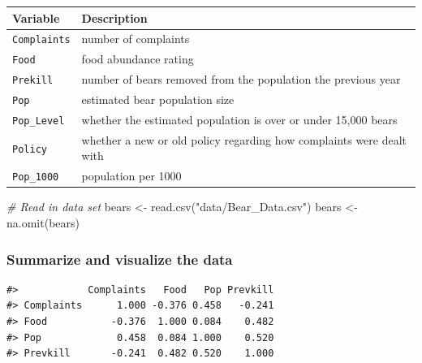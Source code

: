 \documentclass[
]{report}
\newenvironment{Shaded}{\begin{snugshade}}{\end{snugshade}}
\newcommand{\CommentTok}[1]{\textcolor[rgb]{0.56,0.35,0.01}{\textit{#1}}}
\newcommand{\FunctionTok}[1]{\textcolor[rgb]{0.00,0.00,0.00}{#1}}
\newcommand{\NormalTok}[1]{#1}
\newcommand{\OtherTok}[1]{\textcolor[rgb]{0.56,0.35,0.01}{#1}}
\newcommand{\StringTok}[1]{\textcolor[rgb]{0.31,0.60,0.02}{#1}}
\begin{document}
\begin{longtable}[]{@{}
  >{\raggedright\arraybackslash}p{}
  >{\raggedright\arraybackslash}p{}@{}}
\toprule
\textbf{Variable} & \textbf{Description} \\
\midrule
\endhead
\texttt{Complaints} & number of complaints \\
\texttt{Food} & food abundance rating \\
\texttt{Prekill} & number of bears removed from the population the previous year \\
\texttt{Pop} & estimated bear population size \\
\texttt{Pop\_Level} & whether the estimated population is over or under 15,000 bears \\
\texttt{Policy} & whether a new or old policy regarding how complaints were dealt with \\
\texttt{Pop\_1000} & population per 1000 \\
\bottomrule
\end{longtable}

\begin{Shaded}
\begin{Highlighting}[]
\CommentTok{\# Read in data set}
\NormalTok{bears }\OtherTok{\textless{}{-}} \FunctionTok{read.csv}\NormalTok{(}\StringTok{"data/Bear\_Data.csv"}\NormalTok{)}
\NormalTok{bears }\OtherTok{\textless{}{-}} \FunctionTok{na.omit}\NormalTok{(bears)}
\end{Highlighting}
\end{Shaded}

\hypertarget{summarize-and-visualize-the-data-8}{%
\subsubsection*{Summarize and visualize the data}\label{summarize-and-visualize-the-data-8}}

\begin{verbatim}
#>            Complaints   Food   Pop Prevkill
#> Complaints      1.000 -0.376 0.458   -0.241
#> Food           -0.376  1.000 0.084    0.482
#> Pop             0.458  0.084 1.000    0.520
#> Prevkill       -0.241  0.482 0.520    1.000
\end{verbatim}
\end{document}
